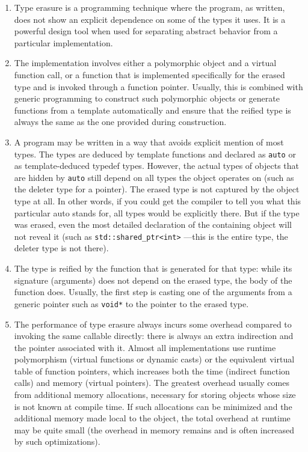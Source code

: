 \begin{enumerate}
\item
  Type erasure is a programming technique where the program, as written, does not show an explicit dependence on some of the types it uses. It is a powerful design tool when used for separating abstract behavior from a particular implementation.
\item
  The implementation involves either a polymorphic object and a virtual function call, or a function that is implemented specifically for the erased type and is invoked through a function pointer. Usually, this is combined with generic programming to construct such polymorphic objects or generate functions from a template automatically and ensure that the reified type is always the same as the one provided during construction.
\item
  A program may be written in a way that avoids explicit mention of most types. The types are deduced by template functions and declared as \texttt{auto} or as template-deduced typedef types. However, the actual types of objects that are hidden by \texttt{auto} still depend on all types the object operates on (such as the deleter type for a pointer). The erased type is not captured by the object type at all. In other words, if you could get the compiler to tell you what this particular auto stands for, all types would be explicitly there. But if the type was erased, even the most detailed declaration of the containing object will not reveal it (such as \texttt{std::shared\_ptr\textless{}int\textgreater{}} ---this is the entire type, the deleter type is not there).
\item
  The type is reified by the function that is generated for that type: while its signature (arguments) does not depend on the erased type, the body of the function does. Usually, the first step is casting one of the arguments from a generic pointer such as \texttt{void*} to the pointer to the erased type.
\item
  The performance of type erasure always incurs some overhead compared to invoking the same callable directly: there is always an extra indirection and the pointer associated with it. Almost all implementations use runtime polymorphism (virtual functions or dynamic casts) or the equivalent virtual table of function pointers, which increases both the time (indirect function calls) and memory (virtual pointers). The greatest overhead usually comes from additional memory allocations, necessary for storing objects whose size is not known at compile time. If such allocations can be minimized and the additional memory made local to the object, the total overhead at runtime may be quite small (the overhead in memory remains and is often increased by such optimizations).
\end{enumerate}

